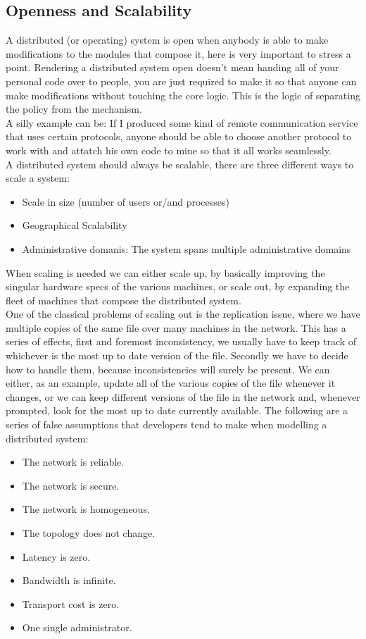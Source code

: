 \subsection{Openness and Scalability}
A distributed (or operating) system is open when anybody is able to make modifications to the modules that compose it, here is very important to stress a point. Rendering a distributed system open doesn't mean handing all of your personal code over to people, you are just required to make it so that anyone can make modifications without touching the core logic. This is the logic of separating the policy from the mechanism. \\
A silly example can be: If I produced some kind of remote communication service that uses certain protocols, anyone should be able to choose another protocol to work with and attatch his own code to mine so that it all works seamlessly. \\
A distributed system should always be scalable, there are three different ways to scale a system:
\begin{itemize}
    \item Scale in size (number of users or/and processes)
    \item Geographical Scalability
    \item Administrative domanis: The system spans multiple administrative domains
\end{itemize}
When scaling is needed we can either scale up, by basically improving the singular hardware specs of the various machines, or scale out, by expanding the fleet of machines that compose the distributed system. \\
One of the classical problems of scaling out is the replication issue, where we have multiple copies of the same file over many machines in the network. This has a series of effects, first and foremost inconsistency, we usually have to keep track of whichever is the most up to date version of the file. Secondly we have to decide how to handle them, because inconsistencies will surely be present. We can either, as an example, update all of the various copies of the file whenever it changes, or we can keep different versions of the file in the network and, whenever prompted, look for the most up to date currently available.
\subSpace
The following are a series of false assumptions that developers tend to make when modelling a distributed system:
\begin{itemize}
    \item The network is reliable.
    \item The network is secure.
    \item The network is homogeneous.
    \item The topology does not change.
    \item Latency is zero.
    \item Bandwidth is infinite.
    \item Transport cost is zero.
    \item One single administrator.
\end{itemize}
